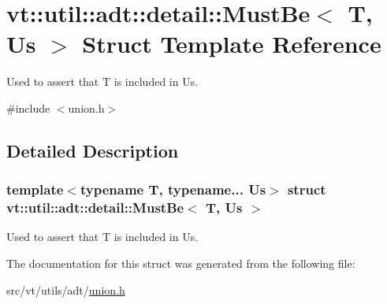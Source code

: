 \hypertarget{structvt_1_1util_1_1adt_1_1detail_1_1_must_be}{}\section{vt\+:\+:util\+:\+:adt\+:\+:detail\+:\+:Must\+Be$<$ T, Us $>$ Struct Template Reference}
\label{structvt_1_1util_1_1adt_1_1detail_1_1_must_be}


Used to assert that {\ttfamily T} is included in {\ttfamily Us}.  




{\ttfamily \#include $<$union.\+h$>$}



\subsection{Detailed Description}
\subsubsection*{template$<$typename T, typename... Us$>$\newline
struct vt\+::util\+::adt\+::detail\+::\+Must\+Be$<$ T, Us $>$}

Used to assert that {\ttfamily T} is included in {\ttfamily Us}. 

The documentation for this struct was generated from the following file\+:\begin{DoxyCompactItemize}
\item 
src/vt/utils/adt/\hyperlink{union_8h}{union.\+h}\end{DoxyCompactItemize}
